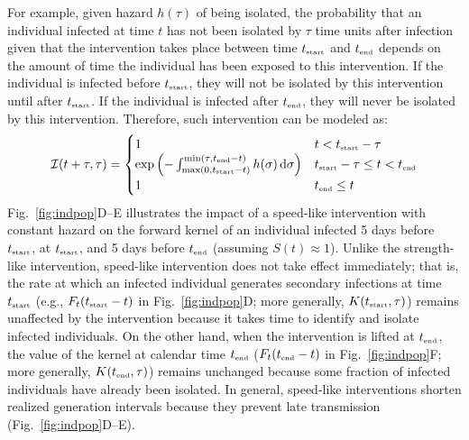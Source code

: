\documentclass[12pt]{article}
\newcommand{\fref}[1]{Fig.~\ref{fig:#1}}
\newcommand{\tsub}[2]{#1_{{\textrm{\tiny #2}}}}
\newcommand{\dd}[1]{\ensuremath{\, \mathrm{d}#1}}
\newcommand{\tstart}{\ensuremath{\tsub{t}{start}}\xspace}
\newcommand{\tend}{\ensuremath{\tsub{t}{end}}\xspace}
\newcommand{\II}{{\mathcal I}}
\begin{document}
For example, given hazard $h(\tau)$ of being isolated, the probability that an individual infected at time $t$ has not been isolated by $\tau$ time units after infection given that the intervention takes place between time \tstart and \tend depends on the amount of time the individual has been exposed to this intervention.
If the individual is infected before $\tstart$, they will not be isolated by this intervention until after $\tstart$.
If the individual is infected after $\tend$, they will never be isolated by this intervention.
Therefore, such intervention can be modeled as:
\begin{equation}
\II(t+\tau, \tau) = \begin{cases}
1 & t < \tstart-\tau \\
\exp\left(- \int_{\max(0, \tstart - t)}^{\min(\tau, \tend-t)} h(\sigma)\dd{\sigma} \right) & \tstart-\tau \leq t < \tend \\
1 & \tend \leq t
\end{cases}
\end{equation}
\fref{indpop}D--E illustrates the impact of a speed-like intervention with constant hazard on the forward kernel of an individual infected 5 days before $\tstart$, at $\tstart$, and 5 days before $\tend$ (assuming $S(t) \approx 1$).
Unlike the strength-like intervention, speed-like intervention does not take effect immediately;
that is, the rate at which an infected individual generates secondary infections at time $\tstart$ (e.g., $F_t(\tstart-t)$ in \fref{indpop}D; more generally, $K(\tstart, \tau)$) remains unaffected by the intervention because it takes time to identify and isolate infected individuals.
On the other hand, when the intervention is lifted at $\tend$, the value of the kernel at calendar time $\tend$ ($F_t(\tend-t)$ in \fref{indpop}F; more generally, $K(\tend, \tau)$) remains unchanged because some fraction of infected individuals have already been isolated.
In general, speed-like interventions shorten realized generation intervals because they prevent late transmission (\fref{indpop}D--E).
\end{document}
